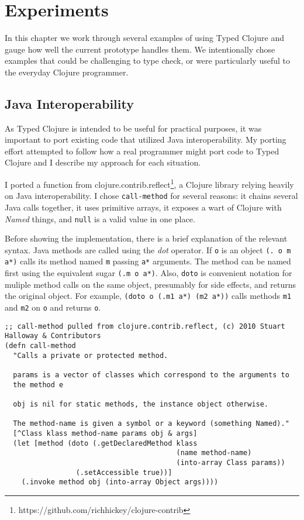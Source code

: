 \chapter{Experiments}

In this chapter we work through several examples of using Typed Clojure and
gauge how well the current prototype handles them. 
We intentionally chose examples that could be challenging to type check,
or were particularly useful to the everyday Clojure programmer.

\section{Java Interoperability}
\label{sec:experimentinterop}

As Typed Clojure is intended to be useful for practical purposes, it was important
to port existing code that utilized Java interoperability.
My porting effort attempted to follow how a real programmer might port code to Typed Clojure
and I describe my approach for each situation.

I ported a function from clojure.contrib.reflect\footnote{https://github.com/richhickey/clojure-contrib},
a Clojure library relying heavily on Java interoperability.
I chose \lstinline|call-method| for several reasons: it chains several Java calls together,
it uses primitive arrays, it exposes a wart of Clojure with \emph{Named} things,
and \lstinline|null| is a valid value in one place.

Before showing the implementation, there is a brief explanation of the relevant syntax.
Java methods are called using the \emph{dot} operator. If \lstinline|o| is an object \lstinline|(. o m a*)|
calls its method named \lstinline|m| passing \lstinline|a*| arguments. The method can be named first
using the equivalent sugar \lstinline|(.m o a*)|. Also, \lstinline|doto| is convenient 
notation for muliple method calls on the same object, presumably for side effects, and returns the original
object. For example, \lstinline|(doto o (.m1 a*) (m2 a*))| calls methods \lstinline|m1| and \lstinline|m2|
on \lstinline|o| and returns \lstinline|o|.

\begin{lstlisting}[caption=call-method, label=lst:callmethod]
;; call-method pulled from clojure.contrib.reflect, (c) 2010 Stuart Halloway & Contributors
(defn call-method
  "Calls a private or protected method.

  params is a vector of classes which correspond to the arguments to
  the method e

  obj is nil for static methods, the instance object otherwise.

  The method-name is given a symbol or a keyword (something Named)."
  [^Class klass method-name params obj & args]
  (let [method (doto (.getDeclaredMethod klass 
                                         (name method-name)
                                         (into-array Class params))
                 (.setAccessible true))]
    (.invoke method obj (into-array Object args))))
\end{lstlisting}

